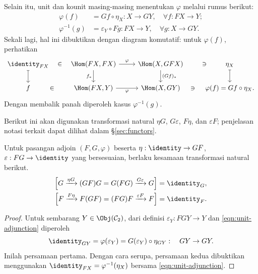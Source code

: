 Selain itu, unit dan kounit masing-masing menentukan $\varphi$ melalui rumus berikut:
\begin{equation}\label{eqn:unit-adjunction}\begin{aligned}
	\varphi(f) & = Gf \circ \eta_X : X \to GY, \quad \forall f: FX \to Y ; \\
	\varphi^{-1}(g) & = \varepsilon_Y \circ Fg: FX \to Y , \quad \forall g: X \to GY.
\end{aligned}\end{equation}
Sekali lagi, hal ini dibuktikan dengan diagram komutatif: untuk $\varphi(f)$, perhatikan
\[ \begin{tikzcd}
	\identity_{FX} \arrow[phantom, r, description, "\in"] \arrow[mapsto, d] & \Hom(FX, FX) \arrow[r, "\varphi"] \arrow[d, "f_*"'] & \Hom(X, GFX) \arrow[d, "(Gf)_*"] & \arrow[phantom, l, description, "\ni"] \eta_X \arrow[mapsto, d] \\
	f \arrow[phantom, r, description, "\in"] & \Hom(FX, Y) \arrow[r, "\varphi"'] & \Hom(X, GY) & \arrow[phantom, l, description, "\ni"] \varphi(f) = Gf \circ \eta_X .
\end{tikzcd} \]
Dengan membalik panah diperoleh kasus $\varphi^{-1}(g)$.

Berikut ini akan digunakan transformasi natural $\eta G$, $G\varepsilon$, $F\eta$, dan $\varepsilon F$; penjelasan notasi terkait dapat dilihat dalam \S\ref{sec:functors}.

\begin{lemma}
	Untuk pasangan adjoin $(F, G, \varphi)$ beserta $\eta: \identity \to GF$, $\varepsilon: FG \to \identity$ yang bersesuaian, berlaku kesamaan transformasi natural berikut.
	\begin{equation}\label{eqn:unit-counit-relation}\begin{aligned}
		\left[ G \xrightarrow{\eta G} (GF)G = G(FG) \xrightarrow{G \varepsilon} G \right] = \identity_G , \\
		\left[ F \xrightarrow{F \eta} F(GF) = (FG)F \xrightarrow{\varepsilon F} F \right] = \identity_F.
	\end{aligned}\end{equation}
\end{lemma}
\begin{proof}
	Untuk sembarang $Y \in \Obj(\mathcal{C}_2)$, dari definisi $\varepsilon_Y: FGY \to Y$ dan \eqref{eqn:unit-adjunction} diperoleh
	\[ \identity_{GY} = \varphi(\varepsilon_Y) = G(\varepsilon_Y) \circ \eta_{GY}: \quad GY \to GY. \]
	Inilah persamaan pertama. Dengan cara serupa, persamaan kedua dibuktikan menggunakan $\identity_{FX} = \varphi^{-1}(\eta_X)$ bersama \eqref{eqn:unit-adjunction}.
\end{proof}

